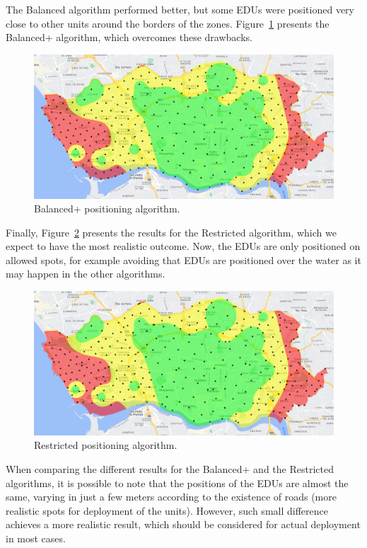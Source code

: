 \begin{refsection}
The Balanced algorithm performed better, but some EDUs were positioned very close to other units around the borders of the zones. Figure~\ref{Fig:edus_enhanced} presents the Balanced+ algorithm, which overcomes these drawbacks.

\begin{figure}[htbp!]
  \centering
  \includegraphics[width=0.9\linewidth]{Chapters/3-EDUs/images/porto_M3_balanced_plus.png}
  \caption{Balanced+ positioning algorithm.}\label{Fig:edus_enhanced}
\end{figure}

Finally, Figure~\ref{Fig:edus_restricted} presents the results for the Restricted algorithm, which we expect to have the most realistic outcome. Now, the EDUs are only positioned on allowed spots, for example avoiding that EDUs are positioned over the water as it may happen in the other algorithms.  

\begin{figure}[htbp!]
  \centering
  \includegraphics[width=0.9\linewidth]{Chapters/3-EDUs/images/porto_M3_restricted.png}
  \caption{Restricted positioning algorithm.}\label{Fig:edus_restricted}
\end{figure}

When comparing the different results for the Balanced+ and the Restricted algorithms, it is possible to note that the positions of the EDUs are almost the same, varying in just a few meters according to the existence of roads (more realistic spots for deployment of the units). However, such small difference achieves a more realistic result, which should be considered for actual deployment in most cases.


\end{refsection}
